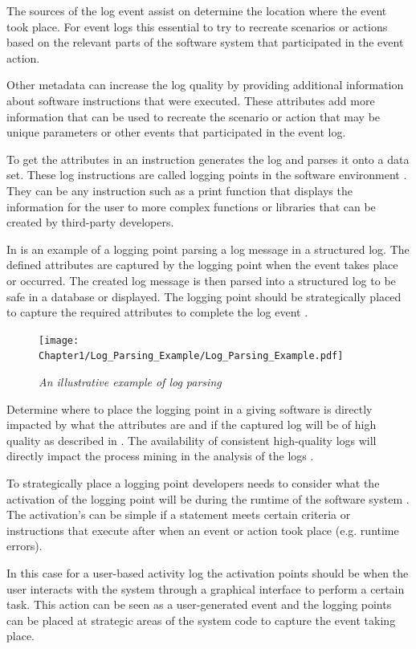 The sources of the log event assist on determine the location where the event took place. For event logs this essential to try to recreate scenarios or actions based on the relevant parts of the software system that participated in the event action.\par Other metadata can increase the log quality by providing additional information about software instructions that were executed. These attributes add more information that can be used to recreate the scenario or action that may be unique parameters or other events that participated in the event log.\par To get the attributes in  an instruction generates the log and parses it onto a data set. These log instructions are called logging points in the software environment \cite{Pecchia2015, Zhu2015}. They can be any instruction such as a print function that displays the information for the user to more complex functions or libraries that can be created by third-party developers.

In  is an example of a logging point parsing a log message in a structured log. The defined attributes are captured by the logging point when the event takes place or occurred. The created log message is then parsed into a structured log to be safe in a database or displayed. The logging point should be strategically placed to capture the required attributes to complete the log event \cite{Fedaghi2010}.

\begin{figure}[!htb]
	\centering %
	\texttt{[image: Chapter1/Log\_Parsing\_Example/Log\_Parsing\_Example.pdf]}
	\caption[An illustrative example of log parsing]
	{\textit{An illustrative example of log parsing \cite{Zhu2019}}} \label{fig:ch1_logParsing}
\end{figure}

Determine where to place the logging point in a giving software is directly impacted by what the attributes are and if the captured log will be of high quality as described in . The availability of consistent high-quality logs will directly impact the process mining in the analysis of the logs \cite{Kherbouche2017}.\par To strategically place a logging point developers needs to consider what the activation of the logging point will be during the runtime of the software system \cite{Pecchia2015, Cinque2013}. The activation's can be simple if a statement meets certain criteria or instructions that execute after when an event or action took place (e.g. runtime errors). \par In this case for a user-based activity log the activation points should be when the user interacts with the system through a graphical interface to perform a certain task. This action can be seen as a user-generated event and the logging points can be placed at strategic areas of the system code to capture the event taking place. 

